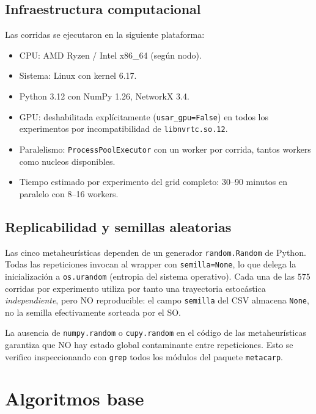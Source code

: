 \documentclass[11pt,a4paper]{article}
\theoremstyle{definition}
\theoremstyle{remark}
\begin{document}
\subsection{Infraestructura computacional}
\label{sec:infra}

Las corridas se ejecutaron en la siguiente plataforma:
\begin{itemize}
\item CPU: AMD Ryzen / Intel x86\_64 (según nodo).
\item Sistema: Linux con kernel 6.17.
\item Python 3.12 con NumPy 1.26, NetworkX 3.4.
\item GPU: deshabilitada explícitamente (\texttt{usar\_gpu=False}) en
  todos los experimentos por incompatibilidad de \texttt{libnvrtc.so.12}.
\item Paralelismo: \texttt{ProcessPoolExecutor} con un worker por
  corrida, tantos workers como nucleos disponibles.
\item Tiempo estimado por experimento del grid completo: 30--90
  minutos en paralelo con 8--16 workers.
\end{itemize}

\subsection{Replicabilidad y semillas aleatorias}
\label{sec:semillas}

Las cinco metaheurísticas dependen de un generador \texttt{random.Random}
de Python. Todas las repeticiones invocan al wrapper con
\texttt{semilla=None}, lo que delega la inicialización a
\texttt{os.urandom} (entropia del sistema operativo). Cada una de las
$575$ corridas por experimento utiliza por tanto una trayectoria
estocástica \emph{independiente}, pero NO reproducible: el campo
\texttt{semilla} del CSV almacena \texttt{None}, no la semilla
efectivamente sorteada por el SO.

La ausencia de \texttt{numpy.random} o \texttt{cupy.random} en el
código de las metaheurísticas garantiza que NO hay estado global
contaminante entre repeticiones. Esto se verifico inspeccionando con
\texttt{grep} todos los módulos del paquete \texttt{metacarp}.

\section{Algoritmos base}
\label{sec:algoritmos-base}
\end{document}
